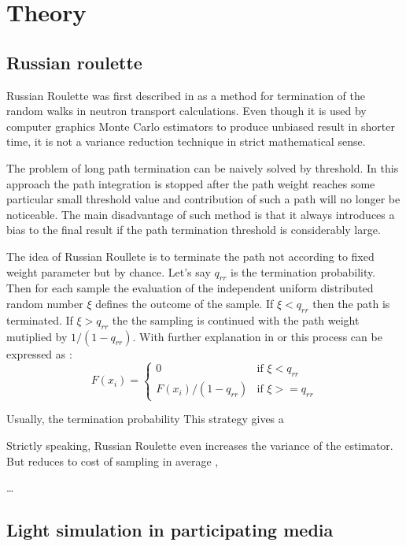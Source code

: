 \chapter{Theory}
\label{chapter:theory}



\section{Russian roulette}
\label{subsection:rr}
Russian Roulette was first described in \cite{hammersley64} as a method for termination of the
random walks in neutron transport calculations. Even though it is used by computer graphics Monte
Carlo estimators to produce unbiased result in shorter time, it is not a variance reduction
technique in strict mathematical sense. 

The problem of long path termination can be naively solved by threshold. In this approach the
path integration is stopped after the path weight reaches some particular small threshold value and
contribution of such a path will no longer be noticeable. The main disadvantage of such method is
that it always introduces a bias to the final result if the path termination threshold is
considerably large.

The idea of Russian Roullete is to terminate the path not according to fixed weight parameter but by
chance. Let's say $q_{rr}$ is the termination probability. Then for each sample the evaluation of
the independent uniform distributed random number $\xi$ defines the outcome of the sample. If
$\xi<q_{rr}$ then the path is terminated. If $\xi>q_{rr}$ the the sampling is continued with the
path weight mutiplied by $1/(1-q_{rr})$. With further explanation in \cite{pharr2010physically}
or \cite{Veach:1998:RMC:927297} this process can be expressed as :
\[ F(x_i) = \begin{cases} 0 & \mbox{if } \xi<q_{rr} \\ F(x_i)/(1-q_{rr}) & \mbox{if } \xi>=q_{rr}
\end{cases}
\]

Usually, the termination probability This strategy gives a 

Strictly speaking, Russian Roulette even increases the variance of the estimator. But reduces to
cost of sampling in average \cite{Veach:1998:RMC:927297}, \cite{Csi03variancereduction}


\ldots

\section{Light simulation in participating media}
\label{section:light_simulation_theory}

